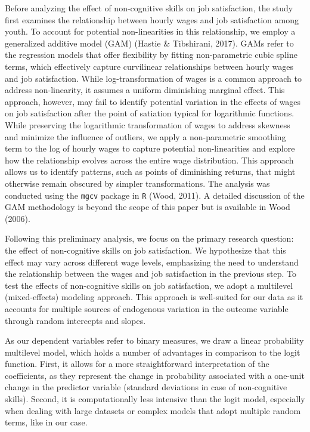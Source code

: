 \documentclass[
]{interact}
\begin{document}
Before analyzing the effect of non-cognitive skills on job satisfaction,
the study first examines the relationship between hourly wages and job
satisfaction among youth. To account for potential non-linearities in
this relationship, we employ a generalized additive model (GAM) (Hastie
\& Tibshirani, 2017). GAMs refer to the regression models that offer
flexibility by fitting non-parametric cubic spline terms, which
effectively capture curvilinear relationships between hourly wages and
job satisfaction. While log-transformation of wages is a common approach
to address non-linearity, it assumes a uniform diminishing marginal
effect. This approach, however, may fail to identify potential variation
in the effects of wages on job satisfaction after the point of satiation
typical for logarithmic functions. While preserving the logarithmic
transformation of wages to address skewness and minimize the influence
of outliers, we apply a non-parametric smoothing term to the log of
hourly wages to capture potential non-linearities and explore how the
relationship evolves across the entire wage distribution. This approach
allows us to identify patterns, such as points of diminishing returns,
that might otherwise remain obscured by simpler transformations. The
analysis was conducted using the \texttt{mgcv} package in \texttt{R}
(Wood, 2011). A detailed discussion of the GAM methodology is beyond the
scope of this paper but is available in Wood (2006).

Following this preliminary analysis, we focus on the primary research
question: the effect of non-cognitive skills on job satisfaction. We
hypothesize that this effect may vary across different wage levels,
emphasizing the need to understand the relationship between the wages
and job satisfaction in the previous step. To test the effects of
non-cognitive skills on job satisfaction, we adopt a multilevel
(mixed-effects) modeling approach. This approach is well-suited for our
data as it accounts for multiple sources of endogenous variation in the
outcome variable through random intercepts and slopes.

As our dependent variables refer to binary measures, we draw a linear
probability multilevel model, which holds a number of advantages in
comparison to the logit function. First, it allows for a more
straightforward interpretation of the coefficients, as they represent
the change in probability associated with a one-unit change in the
predictor variable (standard deviations in case of non-cognitive
skills). Second, it is computationally less intensive than the logit
model, especially when dealing with large datasets or complex models
that adopt multiple random terms, like in our case.
\end{document}

